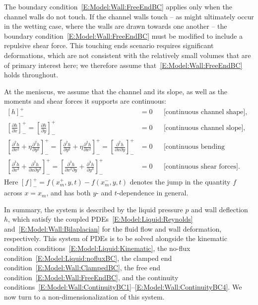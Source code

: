 \documentclass{jfm}
\newcommand{\ddp}[2]{\frac{\partial #1}{\partial #2}}
\newcommand{\poisson}{\eta} %
\newcommand{\x}{x}
\begin{document}
The boundary condition~\eqref{E:Model:Wall:FreeEndBC} applies only when the channel walls do not touch. If the channel walls touch -- as might ultimately occur in the wetting case, where the walls are drawn towards one another -- the boundary condition~\eqref{E:Model:Wall:FreeEndBC} must be modified to include a repulsive shear force. This touching ends scenario requires significant deformations, which are not consistent with the relatively small volumes that are of primary interest here; we therefore assume that~\eqref{E:Model:Wall:FreeEndBC} holds throughout. 

At the meniscus, we assume that the channel and its slope, as well as the moments and shear forces it supports are continuous:
\begin{align}
\left[ h \right]_{-}^{+}  &= 0 & &\text{[continuous channel shape]},\label{E:Model:Wall:ContinuityBC1}\\
\left[\ddp{h}{x} \right]_{-}^{+} = \left[\ddp{h}{y} \right]_{-}^{+} &=0 & &\text{[continuous channel slope],}  \\ 
\left[\ddp{^2 h}{x^2} + \poisson \ddp{^2 h}{y^2} \right]_{-}^{+} =   \left[\ddp{^2 h}{y^2} + \poisson \ddp{^2 h}{x^2}  \right]_{-}^{+} =  \left[\ddp{^2 h}{x \partial y} \right]_{-}^{+} &= 0 & &\text{[continuous bending moments],} \\
\left[\ddp{^3 h}{x^3} + \ddp{^3 h}{ x\partial y^2}\right]_{-}^{+} =  \left[\ddp{^3 h}{ x^2 \partial y} + \ddp{^3 h}{y^3} \right]_{-}^{+} &=0  & &\text{[continuous shear forces].}\label{E:Model:Wall:ContinuityBC4} 
\end{align}
Here $\left[ f \right]_-^+ = f(\x_m^+,y,t) - f(\x_m^-,y,t)$ denotes the jump in the quantity $f$ across $x = x_m$, and has both $y$- and $t$-dependence in general.

In summary, the system is described by the liquid pressure $p$ and wall deflection $h$, which satisfy the coupled PDEs~\eqref{E:Model:Liquid:Reynolds} and~\eqref{E:Model:Wall:Bilaplacian} for the fluid flow and wall deformation, respectively. This system of PDEs is to be solved alongside the kinematic condition conditions~\eqref{E:Model:Liquid:Kinematic}, the no-flux condition~\eqref{E:Model:Liquid:nofluxBC}, the clamped end condition~\eqref{E:Model:Wall:ClampedBC}, the free end condition~\eqref{E:Model:Wall:FreeEndBC}, and the continuity conditions~\eqref{E:Model:Wall:ContinuityBC1}--\eqref{E:Model:Wall:ContinuityBC4}. We now turn to a non-dimensionalization of this system.
\end{document}
